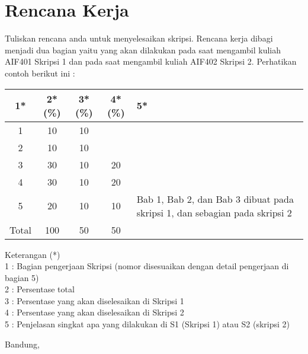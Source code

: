 \documentclass[a4paper,twoside]{article}
\begin{document}
\section{Rencana Kerja}
Tuliskan rencana anda untuk menyelesaikan skripsi. Rencana kerja dibagi menjadi dua bagian yaitu yang akan dilakukan pada saat mengambil kuliah AIF401 Skripsi 1 dan pada saat mengambil kuliah AIF402 Skripsi 2. Perhatikan contoh berikut ini :


\begin{center}
  \begin{tabular}{ | c | c | c | c | l |}
    \hline
    1*  & 2*(\%) & 3*(\%) & 4*(\%) &5*\\ \hline \hline
    1   & 10  & 10  &  &  \\ \hline
    2   & 10 & 10  &   & \\ \hline
    3	& 30 & 10  & 20  & \\ \hline
    4   & 30  & 10  & 20 & \\ \hline
    5   & 20  &  10 &  10 & {\footnotesize Bab 1, Bab 2, dan Bab 3 dibuat pada skripsi 1, dan sebagian pada skripsi 2} \\ \hline
    Total  & 100  & 50  & 50 &  \\ \hline
                          \end{tabular}
\end{center}

Keterangan (*)\\
1 : Bagian pengerjaan Skripsi (nomor disesuaikan dengan detail pengerjaan di bagian 5)\\
2 : Persentase total \\
3 : Persentase yang akan diselesaikan di Skripsi 1 \\
4 : Persentase yang akan diselesaikan di Skripsi 2 \\
5 : Penjelasan singkat apa yang dilakukan di S1 (Skripsi 1) atau S2 (skripsi 2)

\vspace{1cm}
\centering Bandung, \tanggal\\
\vspace{2cm} \nama \\ 
\vspace{1cm}
\end{document}
